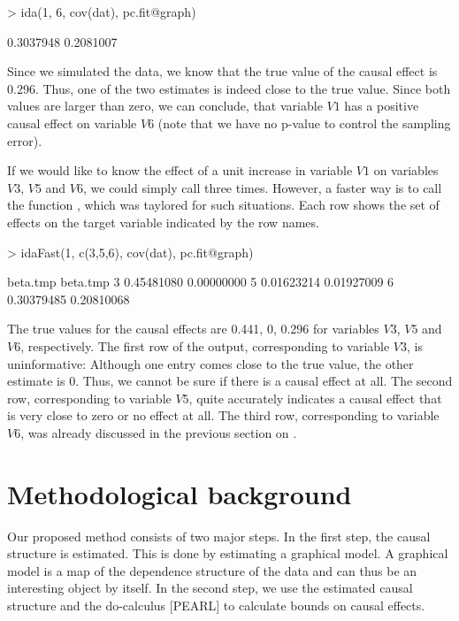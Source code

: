 \documentclass[article]{jss}
\begin{document}
\begin{Schunk}
\begin{Sinput}
> ida(1, 6, cov(dat), pc.fit@graph)
\end{Sinput}
\begin{Soutput}
[1] 0.3037948 0.2081007
\end{Soutput}
\end{Schunk}

Since we simulated the data, we know that the true value of the causal
effect is 0.296. Thus, one of the two estimates is indeed close to the true
value. Since both values are larger than zero, we can conclude, that
variable $V1$ has a positive causal effect on variable $V6$ (note that we have no
p-value to control the sampling error).

If we would like to know the effect of a unit increase in variable $V1$ on
variables $V3$, $V5$ and $V6$, we could simply call  three
times. However, a faster way is to call the function , which
was taylored for such situations. Each row shows the set of effects on the
target variable indicated by the row names.

\begin{Schunk}
\begin{Sinput}
> idaFast(1, c(3,5,6), cov(dat), pc.fit@graph)
\end{Sinput}
\begin{Soutput}
    beta.tmp   beta.tmp
3 0.45481080 0.00000000
5 0.01623214 0.01927009
6 0.30379485 0.20810068
\end{Soutput}
\end{Schunk}

The true values for the causal effects are 0.441, 0, 0.296 for variables
$V3$, $V5$ and $V6$, respectively. The first row of the output,
corresponding to variable $V3$, is uninformative: Although one entry comes
close to the true value, the other estimate is 0. Thus, we cannot be sure
if there is a causal effect at all. The second row, corresponding to
variable $V5$, quite accurately indicates a causal effect that is very close
to zero or no effect at all. The third row, corresponding to variable $V6$,
was already discussed in the previous section on .

\section{Methodological background}
Our proposed method consists of two major steps. In the first step, the
causal structure is estimated. This is done by estimating a graphical
model. A graphical model is a map of the dependence structure of the data
and can thus be an interesting object by itself. In the second step, we use
the estimated causal structure and the do-calculus [PEARL] to calculate
bounds on causal effects.
\end{document}

